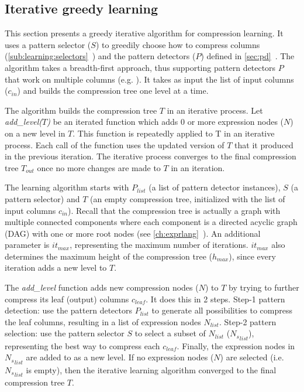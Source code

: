 \subsection{Iterative greedy learning}
\label{sub:learning:iterative}





% 

This section presents a greedy iterative algorithm for compression learning. It uses a pattern selector (\(S\)) to greedily choose how to compress columns (\ref{sub:learning:selectors}~) and the pattern detectors (\(P\)) defined in \ref{sec:pd}~. The algorithm takes a breadth-first approach, thus supporting pattern detectors \(P\) that work on multiple columns (e.g. ). It takes as input the list of input columns (\(c_{in}\)) and builds the compression tree one level at a time.

The algorithm builds the compression tree \(T\) in an iterative process. Let \textit{add\_level(\(T\))} be an iterated function which adds 0 or more expression nodes (\(N\)) on a new level in \(T\). This function is repeatedly applied to T in an iterative process. Each call of the function uses the updated version of \(T\) that it produced in the previous iteration. The iterative process converges to the final compression tree \(T_{out}\) once no more changes are made to \(T\) in an iteration.

The learning algorithm starts with \(P_{list}\) (a list of pattern detector instances), \(S\) (a pattern selector) and \(T\) (an empty compression tree, initialized with the list of input columns \(c_{in}\)). Recall that the compression tree is actually a graph with multiple connected components where each component is a directed acyclic graph (DAG) with one or more root nodes (see \ref{ch:exprlang}~). An additional parameter is \(it_{max}\), representing the maximum number of iterations. \(it_{max}\) also determines the maximum height of the compression tree (\(h_{max}\)), since every iteration adds a new level to \(T\).

The \textit{add\_level} function adds new compression nodes (\(N\)) to \(T\) by trying to further compress its leaf (output) columns \(c_{leaf}\). It does this in 2 steps. Step-1 pattern detection: use the pattern detectors \(P_{list}\) to generate all possibilities to compress the leaf columns, resulting in a list of expression nodes \(N_{list}\). Step-2 pattern selection: use the pattern selector \(S\) to select a subset of \(N_{list}\) (\({N_{s}}_{list}\)), representing the best way to compress each \(c_{leaf}\). Finally, the expression nodes in \({N_{s}}_{list}\) are added to as a new level. If no expression nodes (\(N\)) are selected (i.e. \({N_{s}}_{list}\) is empty), then the iterative learning algorithm converged to the final compression tree \(T\).

